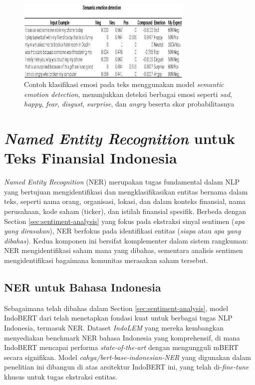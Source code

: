 \begin{figure}[H]
  \centering
  \includegraphics[width=0.75\textwidth]{image/sentiment-analysis-example.jpg}
  \caption{Contoh klasifikasi emosi pada teks menggunakan model \textit{semantic emotion detection}, menunjukkan deteksi berbagai emosi seperti \textit{sad}, \textit{happy}, \textit{fear}, \textit{disgust}, \textit{surprise}, dan \textit{angry} beserta skor probabilitasnya}
  \label{fig:sentiment-example}
\end{figure}

\section{\textit{Named Entity Recognition} untuk Teks Finansial Indonesia}
\label{sec:ner}

\textit{Named Entity Recognition} (NER) merupakan tugas fundamental dalam NLP yang bertujuan mengidentifikasi dan mengklasifikasikan entitas bernama dalam teks, seperti nama orang, organisasi, lokasi, dan dalam konteks finansial, nama perusahaan, kode saham (ticker), dan istilah finansial spesifik. Berbeda dengan Section \ref{sec:sentiment-analysis} yang fokus pada ekstraksi sinyal sentimen (\textit{apa yang dirasakan}), NER berfokus pada identifikasi entitas (\textit{siapa} atau \textit{apa yang dibahas}). Kedua komponen ini bersifat komplementer dalam sistem rangkuman: NER mengidentifikasi saham mana yang dibahas, sementara analisis sentimen mengidentifikasi bagaimana komunitas merasakan saham tersebut.

\subsection{NER untuk Bahasa Indonesia}

Sebagaimana telah dibahas dalam Section \ref{sec:sentiment-analysis}, model IndoBERT dari \textcite{koto2020} telah menetapkan fondasi kuat untuk berbagai tugas NLP Indonesia, termasuk NER. Dataset \textit{IndoLEM} yang mereka kembangkan menyediakan benchmark NER bahasa Indonesia yang komprehensif, di mana IndoBERT mencapai performa \textit{state-of-the-art} dengan mengungguli mBERT secara signifikan. Model \textit{cahya/bert-base-indonesian-NER} yang digunakan dalam penelitian ini dibangun di atas arsitektur IndoBERT ini, yang telah di-\textit{fine-tune} khusus untuk tugas ekstraksi entitas.

